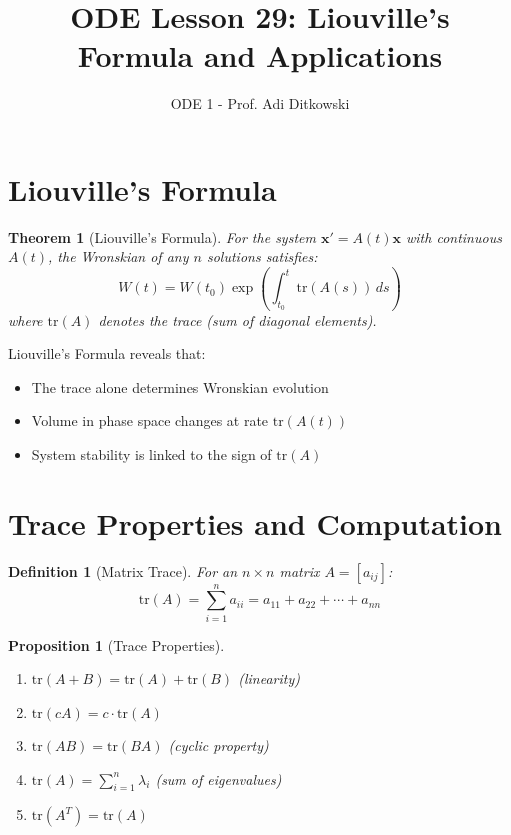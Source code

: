 \documentclass[12pt]{article}
\title{ODE Lesson 29: Liouville's Formula and Applications}
\author{ODE 1 - Prof. Adi Ditkowski}
\date{}
\newtheorem{definition}{Definition}
\newtheorem{theorem}{Theorem}
\newtheorem{proposition}{Proposition}
\begin{document}
\maketitle

\section{Liouville's Formula}

\begin{theorem}[Liouville's Formula]
For the system $\mathbf{x}' = A(t)\mathbf{x}$ with continuous $A(t)$, the Wronskian of any $n$ solutions satisfies:
$$W(t) = W(t_{0}) \exp\left(\int_{t_{0}}^{t} \text{tr}(A(s))\,ds\right)$$
where $\text{tr}(A)$ denotes the trace (sum of diagonal elements).
\end{theorem}

\begin{keypoint}
Liouville's Formula reveals that:
\begin{itemize}
\item The trace alone determines Wronskian evolution
\item Volume in phase space changes at rate $\text{tr}(A(t))$
\item System stability is linked to the sign of $\text{tr}(A)$
\end{itemize}
\end{keypoint}

\section{Trace Properties and Computation}

\begin{definition}[Matrix Trace]
For an $n \times n$ matrix $A = [a_{ij}]$:
$$\text{tr}(A) = \sum_{i=1}^{n} a_{ii} = a_{11} + a_{22} + \cdots + a_{nn}$$
\end{definition}

\begin{proposition}[Trace Properties]
\begin{enumerate}
\item $\text{tr}(A + B) = \text{tr}(A) + \text{tr}(B)$ (linearity)
\item $\text{tr}(cA) = c \cdot \text{tr}(A)$
\item $\text{tr}(AB) = \text{tr}(BA)$ (cyclic property)
\item $\text{tr}(A) = \sum_{i=1}^{n} \lambda_{i}$ (sum of eigenvalues)
\item $\text{tr}(A^{T}) = \text{tr}(A)$
\end{enumerate}
\end{proposition}
\end{document}
